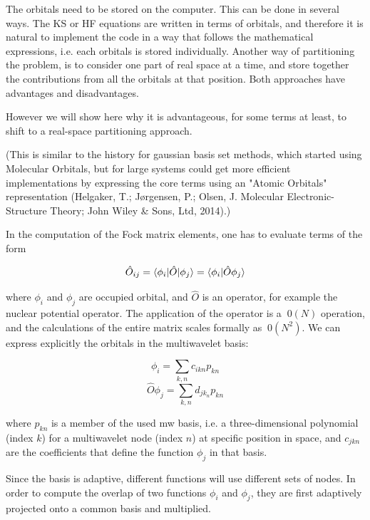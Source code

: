 \documentclass{article}
\begin{document}
The orbitals need to be stored on the computer. This can be done in several ways. The KS or HF equations are written in terms of orbitals, and therefore it is natural to implement the code in a way that follows the mathematical expressions, i.e. each orbitals is stored individually. Another way of partitioning the problem, is to consider one part of real space at a time, and store together the contributions from all the orbitals at that position. Both approaches have advantages and disadvantages.

However we will show here why it is advantageous, for some terms at least, to shift to a real-space partitioning approach.

(This is similar to the history for gaussian basis set methods, which started using Molecular Orbitals, but for large systems could get more efficient implementations by expressing the core terms using an "Atomic Orbitals" representation (Helgaker, T.; Jørgensen, P.; Olsen, J. Molecular Electronic-Structure Theory; John Wiley \& Sons, Ltd, 2014).)

In the computation of the Fock matrix elements, one has to evaluate terms of the form 

\begin{equation}
  {\hat O}_{ij} = \braket{\phi_i | {\hat O} |\phi_j}  = \braket{\phi_i | {\hat O} \phi_j} 
\end{equation}

where $\phi_i$ and $\phi_j$ are occupied orbital, and ${\hat O}$ is an operator, for example the nuclear potential operator. The application of the operator is a $~0(N)$ operation, and the calculations of the entire matrix scales formally as $~0(N^2)$. We can express explicitly the orbitals in the multiwavelet basis:

\begin{equation}
  \phi_i = \sum_{k,n} c_{ikn} p_{kn} 
\end{equation}
\begin{equation}
  {\hat O} \phi_j = \sum_{k,n} d_{jk_n} p_{kn} 
\end{equation}

where $p_{kn}$ is a member of the used mw basis, i.e. a three-dimensional polynomial (index $k$) for a multiwavelet node (index $n$) at specific position in space, and $c_{jkn}$ are the coefficients that define the function $\phi_j$ in that basis. 

Since the basis is adaptive, different functions will use different sets of nodes. 
In order to compute the overlap of two functions $\phi_i$ and $\phi_j$, they are first adaptively projected onto a common basis and multiplied.
\end{document}
